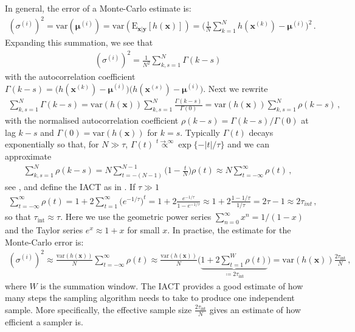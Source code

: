 In general, the error of a Monte-Carlo estimate is:
\begin{align}
	(\sigma^{(i)})^2 = \text{var}(\bm{\mu}^{(i)}) =  \text{var}(\text{E}_{\bm{x}|\bm{y}} [h(\bm{x})]) = \Bigg( \frac{1}{N} \sum_{k=1}^{N} h(\bm{x}^{(k)}) - \bm{\mu}^{(i)} \Bigg)^2 \, .
\end{align}
Expanding this summation, we see that
\begin{align}
	(\sigma^{(i)})^2 = \frac{1}{N^2} \sum_{k,s=1}^{N} \Gamma(k-s)
\end{align}
with the autocorrelation coefficient $\Gamma(k-s) =  \big( h(\bm{x}^{(k)}) - \bm{\mu}^{(i)} \big) \big(h(\bm{x}^{(s)}) - \bm{\mu}^{(i)} \big)$.
Next we rewrite
\begin{align}
	\sum_{k,s=1}^{N} \Gamma(k-s) = \text{var}(h(\bm{x}))  \sum_{k,s=1}^{N} \frac{\Gamma(k-s)}{\Gamma(0)} =  \text{var}(h(\bm{x})) \sum_{k,s=1}^{N}\rho(k-s)\, ,
\end{align}
with the normalised autocorrelation coefficient $\rho(k-s) =  \Gamma(k-s)/ \Gamma(0)$ at lag $k-s$ and $\Gamma(0) = \text{var}(h(\bm{x}) )$ for $k=s$.
Typically $\Gamma(t)$ decays exponentially so that, for $N\gg \tau$, $\Gamma(t) \overset{t \rightarrow \infty }{ \propto} \exp\{ - |t| / \tau \}  $ and we can approximate
\begin{align}
	\sum_{k,s=1}^{N}\rho(k-s)  = N \sum_{t = -(N-1) }^{N-1} \Bigg(1- \frac{t}{N} \Bigg) \rho(t)  \approx N  \sum_{t = - \infty }^{\infty} \rho(t) \, ,
\end{align}
see \cite[p. 137]{Sokal1997}, and define the IACT as in \cite[pp. 103-105]{wolff2002LecNot}.
If $\tau \gg 1$
\begin{align}
	\sum_{t = - \infty }^{\infty} \rho(t) =  1 + 2 \sum_{t = 1}^{\infty} \big(e^{-1/ \tau}\big)^t =  1 + 2 \frac{e^{-1/ \tau} }{1 - e^{-1/ \tau}} \approx  1 + 2 \frac{1 -1/ \tau }{1/ \tau} =  2 \tau -1 \approx 2 \tau_{int}\, ,
\end{align}
so that $\tau_{\text{int}} \approx \tau$.
Here we use the geometric power series $\sum^{\infty}_{n=0} x^n= 1/ (1-x)$ and the Taylor series $ e^x \approx 1+x$ for small $x$.
In practise, the estimate for the Monte-Carlo error is:
\begin{align}
	(\sigma^{(i)})^2   \approx \frac{\text{var}(h(\bm{x}) )}{N} \sum_{t = - \infty }^{\infty} \rho(t)
	\approx \frac{\text{var}(h(\bm{x}) )}{N} \Bigg( \underbrace{  1 + 2 \sum_{t = 1}^{W} \rho(t)  }_{ \coloneqq 	2\tau_{\text{int}} }\Bigg) = \text{var}(h(\bm{x})) \frac{ 2 \tau_{\text{int}} }{N}\, ,
\end{align}
where $W$ is the summation window.
The IACT provides a good estimate of how many steps the sampling algorithm needs to take to produce one independent sample.
More specifically, the effective sample size $\frac{ 2 \tau_{\text{int}} }{N}$ gives an estimate of how efficient a sampler is.

